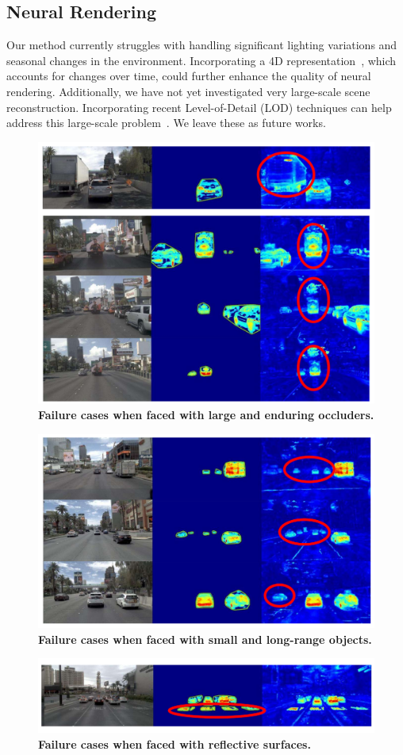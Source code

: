 \subsection{Neural Rendering}
Our method currently struggles with handling significant lighting variations and seasonal changes in the environment. Incorporating a 4D representation~\cite{yang2023gs4d,yan2024street}, which accounts for changes over time, could further enhance the quality of neural rendering. Additionally, we have not yet investigated very large-scale scene reconstruction. Incorporating recent Level-of-Detail (LOD) techniques can help address this large-scale problem~\cite{hierarchicalgaussians24}. We leave these as future works.

 \begin{figure}[ht]
    \centering
    \includegraphics[width=0.66\linewidth]{figs_compressed/limitation-large_compressed.pdf}
    \caption{\textbf{Failure cases when faced with large and enduring occluders.}}
    \label{fig:limitation-large-appendix}
\end{figure}
\begin{figure}[ht]
    \centering
    \includegraphics[width=0.66\linewidth]{figs_compressed/limitation-small_compressed.pdf}
    \caption{\textbf{Failure cases when faced with small and long-range objects.}}
    \label{fig:limitation-small-appendix}
\end{figure}
\begin{figure}[ht]
    \centering
    \includegraphics[width=0.66\linewidth]{figs_compressed/limitation-reflect_compressed.pdf}
    \caption{\textbf{Failure cases when faced with reflective surfaces.}}
    \label{fig:limitation-reflect-appendix}
\end{figure}